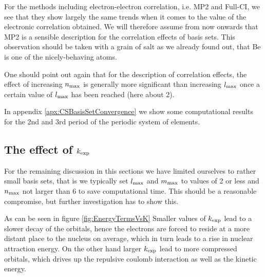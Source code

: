For the methods including electron-electron correlation,
i.e. MP2 and Full-CI,
we see that they show largely the same trends
when it comes to the value of the electronic correlation
obtained.
We will therefore assume from now onwards
that MP2 is a sensible description
for the correlation effects of \CS basis sets.
This observation should be taken with a grain
of salt
as we already found out,
that Be is one of the nicely-behaving atoms.

One should point out again that for the description
of correlation effects, the effect of increasing $n_\text{max}$
is generally more significant than increasing
$l_\text{max}$ once a certain value of $l_\text{max}$ has been reached
(here about 2).

In appendix \vref{apx:CSBasisSetConvergence} we show
some computational results for the 2nd and 3rd
period of the periodic system of elements.


\newcommand{\kopt}{\ensuremath k_\text{opt}}
\subsection{The effect of $k_\text{exp}$}
For the remaining discussion in this sections
we have limited ourselves to rather small basis sets,
that is we typically set $l_\text{max}$ and $m_\text{max}$ to values
of 2 or less and $n_\text{max}$ not larger than 6
to save computational time.
This should be a reasonable compromise,
but further investigation has to show this.

As can be seen in figure \vref{fig:EnergyTermsVsK}
Smaller values of $k_\text{exp}$ lead to a slower decay of the orbitals,
hence the electrons are forced to reside at a more
distant place to the nucleus on average,
which in turn leads to a rise in nuclear attraction energy.
On the other hand larger $k_\text{exp}$ lead to more compressed orbitals,
which drives up the repulsive coulomb interaction as well as the kinetic energy.

